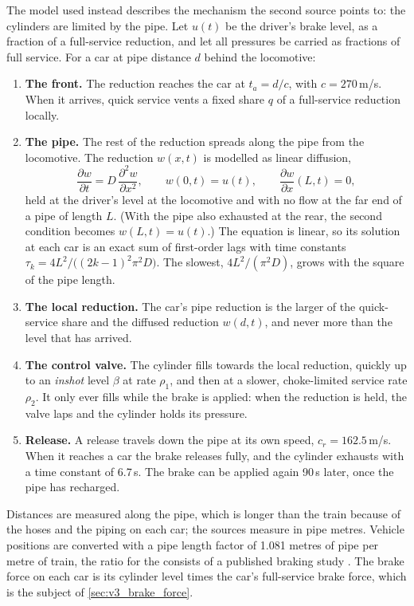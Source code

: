 The model used instead describes the mechanism the second source points to: the cylinders are limited by the pipe. Let $u(t)$ be the driver's brake level, as a fraction of a full-service reduction, and let all pressures be carried as fractions of full service. For a car at pipe distance $d$ behind the locomotive:

\begin{enumerate}
    \item \textbf{The front.} The reduction reaches the car at $t_a = d/c$, with $c = 270$\,m/s. When it arrives, quick service vents a fixed share $q$ of a full-service reduction locally.
    \item \textbf{The pipe.} The rest of the reduction spreads along the pipe from the locomotive. The reduction $w(x,t)$ is modelled as linear diffusion,
    \begin{equation}
        \frac{\partial w}{\partial t} = D\,\frac{\partial^2 w}{\partial x^2},
        \qquad w(0, t) = u(t),
        \qquad \frac{\partial w}{\partial x}(L, t) = 0,
        \label{eq:v3_pipe}
    \end{equation}
    held at the driver's level at the locomotive and with no flow at the far end of a pipe of length $L$. (With the pipe also exhausted at the rear, the second condition becomes $w(L,t) = u(t)$.) The equation is linear, so its solution at each car is an exact sum of first-order lags with time constants $\tau_k = 4L^2/\bigl((2k-1)^2\pi^2 D\bigr)$. The slowest, $4L^2/(\pi^2 D)$, grows with the square of the pipe length.
    \item \textbf{The local reduction.} The car's pipe reduction is the larger of the quick-service share and the diffused reduction $w(d,t)$, and never more than the level that has arrived.
    \item \textbf{The control valve.} The cylinder fills towards the local reduction, quickly up to an \emph{inshot} level $\beta$ at rate $\rho_1$, and then at a slower, choke-limited service rate $\rho_2$. It only ever fills while the brake is applied: when the reduction is held, the valve laps and the cylinder holds its pressure.
    \item \textbf{Release.} A release travels down the pipe at its own speed, $c_r = 162.5$\,m/s. When it reaches a car the brake releases fully, and the cylinder exhausts with a time constant of 6.7\,s. The brake can be applied again 90\,s later, once the pipe has recharged.
\end{enumerate}

Distances are measured along the pipe, which is longer than the train because of the hoses and the piping on each car; the sources measure in pipe metres. Vehicle positions are converted with a pipe length factor of 1.081 metres of pipe per metre of train, the ratio for the consists of a published braking study \cite{NTSB2015Casselton}. The brake force on each car is its cylinder level times the car's full-service brake force, which is the subject of \cref{sec:v3_brake_force}.

